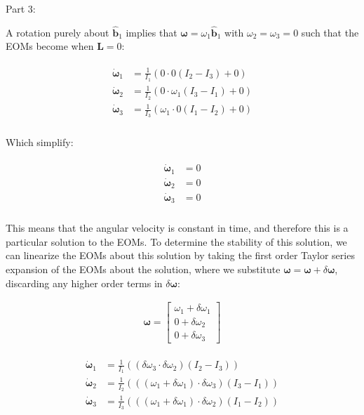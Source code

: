\documentclass[
]{article}
\begin{document}
Part 3:

A rotation purely about \(\hat{\boldsymbol{b}}_1\) implies that
\(\boldsymbol{\omega} = \omega_1 \hat{\boldsymbol{b}}_1\) with
\(\omega_2=\omega_3 = 0\) such that the EOMs become when
\(\boldsymbol{L} = 0\):

\[\begin{aligned}
\begin{aligned}
    \dot{\boldsymbol{\omega}}_1 &= \frac{1}{I_1} \left(0 \cdot 0 \left(I_2 - I_3\right) + 0 \right)\\
    \dot{\boldsymbol{\omega}}_2 &= \frac{1}{I_2} \left(0 \cdot \omega_1 \left(I_3 - I_1\right) + 0 \right)\\
    \dot{\boldsymbol{\omega}}_3 &= \frac{1}{I_3} \left(\omega_1 \cdot 0 \left(I_1 - I_2\right) + 0 \right)\\
\end{aligned}
\end{aligned}\]

Which simplify:

\[\begin{aligned}
\begin{aligned}
    \dot{\boldsymbol{\omega}}_1 &= 0\\
    \dot{\boldsymbol{\omega}}_2 &= 0\\
    \dot{\boldsymbol{\omega}}_3 &= 0\\
\end{aligned}
\end{aligned}\]

This means that the angular velocity is constant in time, and therefore
this is a particular solution to the EOMs. To determine the stability of
this solution, we can linearize the EOMs about this solution by taking
the first order Taylor series expansion of the EOMs about the solution,
where we substitute
\(\boldsymbol{\omega} = \boldsymbol{\omega} + \delta\boldsymbol{\omega}\),
discarding any higher order terms in \(\delta\boldsymbol{\omega}\):

\[\begin{aligned}
\boldsymbol{\omega} = 
    \begin{bmatrix} \omega_1 + \delta\omega_1 \\ 0 + \delta\omega_2 \\ 0 + \delta\omega_3 \end{bmatrix}
\end{aligned}\]

\[\begin{aligned}
\begin{aligned}
    \dot{\boldsymbol{\omega}}_1 &= \frac{1}{I_1} \left(\left(\delta\omega_3 \cdot  \delta\omega_2\right) \left(I_2 - I_3\right) \right)\\
    \dot{\boldsymbol{\omega}}_2 &= \frac{1}{I_2} \left(\left(\left(\omega_1 + \delta\omega_1\right) \cdot \delta\omega_3\right) \left(I_3 - I_1\right) \right)\\
    \dot{\boldsymbol{\omega}}_3 &= \frac{1}{I_3} \left(\left(\left(\omega_1 + \delta\omega_1\right) \cdot \delta\omega_2\right) \left(I_1 - I_2\right) \right)\\
\end{aligned}
\end{aligned}\]
\end{document}
